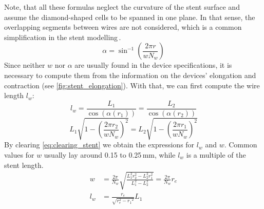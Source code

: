 Note, that all these formulas neglect the curvature of the stent surface and assume the diamond-shaped cells to be spanned in one plane. In that sense, the overlapping segments between wires are not considered, which is a common simplification in the stent modelling\,\cite{Bouillot2016, Larrabide2012}.
\begin{equation}
	\alpha = \sin^{-1}{\left(\frac{2\pi r}{wN_w}\right)}
	\label{eq:winding_angle}
\end{equation}
Since neither $w$ nor $\alpha$ are usually found in the device specifications, it is necessary to compute them from the information on the devices' elongation and contraction (see \autoref{fig:stent_elongation}). With that, we can first compute the wire length $l_w$:
\begin{equation*}
	l_w = \frac{L_1}{\cos(\alpha(r_1))} = \frac{L_2}{\cos(\alpha(r_2))}
\end{equation*}
\begin{equation}
	L_1\sqrt{1-{\left(\frac{2\pi r_2}{wN_w}\right)}^2} = L_2\sqrt{1-{\left(\frac{2\pi r_1}{wN_w}\right)}^2}
	\label{eq:clearing_stent}
\end{equation}
By clearing \autoref{eq:clearing_stent} we obtain the expressions for $l_w$ and $w$. Common values for $w$ usually lay around 0.15 to 0.25\,\si{mm}, while $l_w$ is a multiple of the stent length.
\begin{equation*}
	\begin{split}
		w &= \frac{2\pi}{N_w}\sqrt{\frac{L_1^2r_2^2 - L_2^2r_1^2}{L_1^2-L_2^2}} = \frac{2\pi}{N_w}r_e\\
		l_w &= \frac{r_e}{\sqrt{r_e^2-{r_1}^2}}L_1
	\end{split}
\end{equation*}
